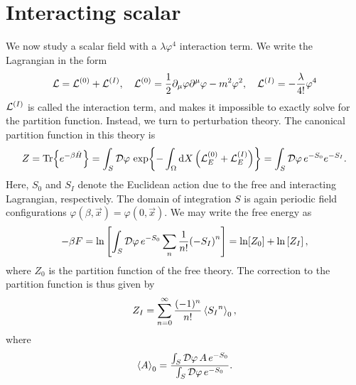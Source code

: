 \section{Interacting scalar}

We now study a scalar field with a $\lambda \varphi^4$ interaction term.
We write the Lagrangian in the form
\begin{equation*}
    \mathcal{L} = \mathcal{L}^{(0)} + \mathcal{L}^{(I)}, \quad 
    \mathcal{L}^{(0)} = 
    \frac{1}{2} \partial_\mu \varphi \partial^\mu \varphi - m^2 \varphi^2 , \quad
    \mathcal{L}^{(I)} = - \frac{\lambda}{4!} \varphi^4
\end{equation*}
$\mathcal{L}^{(I)}$ is called the interaction term, and makes it impossible to exactly solve for the partition function.
Instead, we turn to perturbation theory.
The canonical partition function in this theory is
\begin{equation}
    Z = \Tr{e^{- \beta \hat H}}
    = \int_S \mathcal{D} \varphi \, \exp{
        - \int_\Omega \dd X \left(\mathcal{L}_E^{(0)} + \mathcal{L}_E^{(I)}\right)
    }
    = \int_S \mathcal{D} \varphi \, e^{-S_0} e^{-S_I}.
\end{equation}
Here, $S_0$ and $S_I$ denote the Euclidean action due to the free and interacting Lagrangian, respectively.
The domain of integration $S$ is again periodic field configurations $\varphi(\beta, \vec x) = \varphi(0, \vec x)$.
We may write the free energy as
\begin{equation*}
    - \beta F = \ln
    \left[
        \int_S \mathcal{D} \varphi \, e^{-S_0} \sum_n \frac{1}{n!} {(-S_I)}^n
    \right]
    = \ln[Z_0] 
    + \ln
    \left[
        Z_I
    \right],
\end{equation*}
where $Z_0$ is the partition function of the free theory.
The correction to the partition function is thus given by
\begin{equation}
    Z_I = \sum_{n=0}^\infty \frac{(-1)^n}{n!} \ex{{S_I}^n}_0,
\end{equation}
where
\begin{equation}
    \ex{A}_0 = \frac{
        \int_S \D \varphi \, A \, e^{-S_0} }
    {\int_S \D \varphi \, e^{-S_0}}.
\end{equation}

